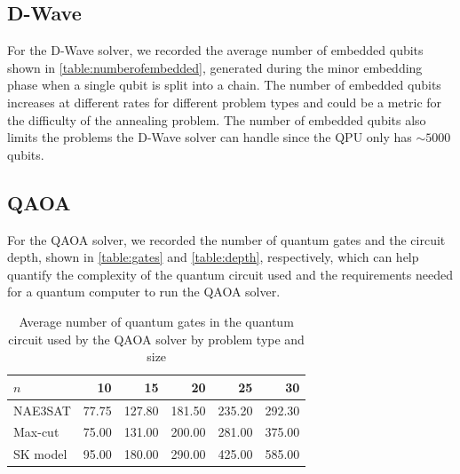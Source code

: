 \subsection{D-Wave}
For the D-Wave solver, we recorded the average number of embedded qubits shown in \autoref{table:numberofembedded}, generated during the minor embedding phase when a single qubit is split into a chain. The number of embedded qubits increases at different rates for different problem types and could be a metric for the difficulty of the annealing problem. The number of embedded qubits also limits the problems the D-Wave solver can handle since the QPU only has $\sim 5000$ qubits.
\begin{table}[!htb]
    \centering
    \caption{Average number of embedded qubits for the D-Wave solver by problem type and size}
    \label{table:numberofembedded}
\end{table}
\subsection{QAOA}
For the QAOA solver, we recorded the number of quantum gates and the circuit depth, shown in \autoref{table:gates} and \autoref{table:depth}, respectively, which can help quantify the complexity of the quantum circuit used and the requirements needed for a quantum computer to run the QAOA solver.
\begin{table}[!htb]
    \centering
    \caption{Average number of quantum gates in the quantum circuit used by the QAOA solver by problem type and size}
    \label{table:gates}
    \begin{tabular}{lrrrrr} \toprule
        $n$ & 10 & 15 & 20 & 25 & 30\\ \midrule
        NAE3SAT & 77.75 & 127.80 & 181.50 & 235.20 & 292.30 \\
        Max-cut & 75.00 & 131.00 & 200.00 & 281.00 & 375.00 \\
        SK model & 95.00 & 180.00 & 290.00 & 425.00 & 585.00\\ \bottomrule
    \end{tabular}
\end{table}

